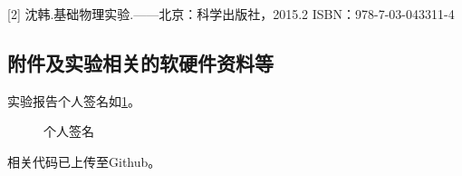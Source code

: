 \documentclass[dvipsnames, svgnames,a4paper,11pt]{article}
\begin{document}
	[2] 沈韩.基础物理实验.——北京：科学出版社，2015.2 ISBN：978-7-03-043311-4
	
	
	\subsection{附件及实验相关的软硬件资料等}
	
	实验报告个人签名如\cref{fig:name}。
	
	\begin{figure}[htbp]
		\centering
		\caption{个人签名}
		\label{fig:name}			
	\end{figure}
	
	
	相关代码已上传至Github。
	
	
	
\end{document}
